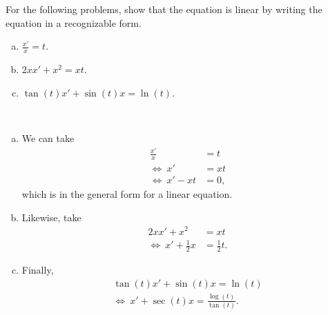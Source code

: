 \documentclass[12pt]{article} %
\begin{document}
\begin{problem}
For the following problems, show that the equation is linear by writing the equation in a recognizable form.
    \begin{enumerate}[(a)]
        \item $\frac{x'}{x} = t$.
        \item $2xx'+x^2=xt$.
        \item $\tan(t) x' + \sin(t) x = \ln(t).$
    \end{enumerate}
\end{problem}
\begin{solution}~
    \begin{enumerate}[(a)]
        \item We can take
        \begin{align*}
            \frac{x'}{x} &= t\\
    \iff ~ x' &= xt\\
    \iff ~ x' - xt &= 0,
        \end{align*}
        which is in the general form for a linear equation.

        \item Likewise, take
        \begin{align*}
            2xx' +x^2 &= xt\\
            \iff ~ x' +\frac{1}{2} x &= \frac{1}{2} t.
        \end{align*}

        \item Finally,
        \begin{align*}
            \tan(t)x' + \sin(t) x = \ln(t)\\
            \iff ~ x' + \sec(t) x = \frac{\log(t)}{\tan(t)}.
        \end{align*}        
    \end{enumerate}
\end{solution}

\newpage
\end{document}
